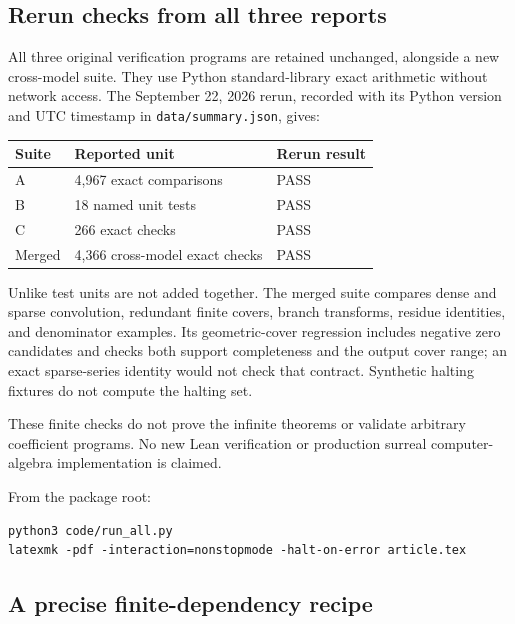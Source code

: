 \documentclass[11pt,letterpaper]{article}
\numberwithin{equation}{section}
\theoremstyle{definition}
\theoremstyle{remark}
\begin{document}
\subsection{Rerun checks from all three reports}
All three original verification programs are retained unchanged, alongside
a new cross-model suite. They use Python standard-library exact arithmetic
without network access. The September 22, 2026 rerun, recorded with its
Python version and UTC timestamp in \texttt{data/summary.json}, gives:
\begin{center}
\begin{tabular}{@{}lll@{}}
\toprule
Suite & Reported unit & Rerun result\\
\midrule
A & 4,967 exact comparisons & PASS\\
B & 18 named unit tests & PASS\\
C & 266 exact checks & PASS\\
Merged & 4,366 cross-model exact checks & PASS\\
\bottomrule
\end{tabular}
\end{center}
Unlike test units are not added together. The merged suite compares dense
and sparse convolution, redundant finite covers, branch transforms, residue
identities, and denominator examples. Its geometric-cover regression includes
negative zero candidates and checks both support completeness and the output
cover range; an exact sparse-series identity would not check that contract. Synthetic halting fixtures do not
compute the halting set.

These finite checks do not prove the infinite theorems or validate arbitrary
coefficient programs. No new Lean verification or production surreal
computer-algebra implementation is claimed.

From the package root:
\begin{lstlisting}
python3 code/run_all.py
latexmk -pdf -interaction=nonstopmode -halt-on-error article.tex
\end{lstlisting}

\subsection{A precise finite-dependency recipe}
\end{document}
